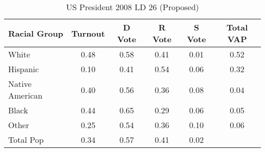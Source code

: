 \begin{table}[htb]
\begin{center}
\caption{US President 2008 LD 26 (Proposed)}
\label{pres08_vap_ld_26}
\begin{tabular}{lccccc}
  \hline
Racial Group & Turnout & D Vote & R Vote & S Vote & Total VAP \\ 
  \hline
White & 0.48 & 0.58 & 0.41 & 0.01 & 0.52 \\ 
  Hispanic & 0.10 & 0.41 & 0.54 & 0.06 & 0.32 \\ 
  Native American & 0.40 & 0.56 & 0.36 & 0.08 & 0.04 \\ 
  Black & 0.44 & 0.65 & 0.29 & 0.06 & 0.05 \\ 
  Other & 0.25 & 0.54 & 0.36 & 0.10 & 0.06 \\ 
  Total Pop & 0.34 & 0.57 & 0.41 & 0.02 &  \\ 
   \hline
\end{tabular}
\end{center}
\end{table}
